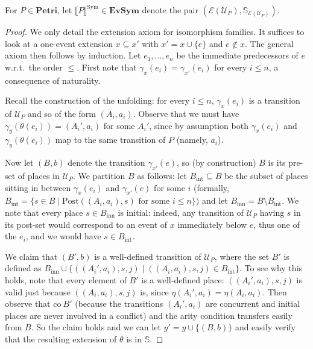 \documentclass[11pt,a4paper]{article}
\theoremstyle{plain}
\theoremstyle{definition}
\theoremstyle{remark}
\newcommand{\calE}{\mathcal{E}}
\newcommand{\calU}{\mathcal{U}}
\newcommand{\Petri}{\mathbf{Petri}}
\newcommand{\SES}{\mathbf{EvSym}}
\newcommand{\Post}{\mathrm{Post}}
\newcommand{\semSA}[1]{\llbracket #1 \rrbracket^{\mathrm{Sym}}}
\begin{document}
For $P \in \Petri$, let $\semSA{P} \in \SES$ denote the pair $(\calE(\calU_{P}), \mathbb{S}_{\calE(\calU_P)})$.



\begin{proof}
    We only detail the extension axiom for isomorphism families. It suffices to look at a one-event extension $x \subseteq x'$ with $x' = x \cup \{ e \}$ and $e \notin x$. The general axiom then follows by induction. Let $e_1, \ldots, e_n$ be the immediate predecessors of $e$ w.r.t.~the order $\leq$. First note that $\gamma_x(e_i) = \gamma_{x'}(e_i)$ for every $i \leq n$, a consequence of naturality.

		Recall the construction of the unfolding: for every $i \leq n$, $\gamma_x(e_i)$ is a transition of $\calU_P$ and so of the form $(A_i, a_i)$. Observe that we must have $\gamma_y(\theta(e_i)) = (A_i', a_i)$ for some $A_i'$, since by assumption both $\gamma_x(e_i)$ and $\gamma_y(\theta(e_i))$ map to the same transition of $P$ (namely, $a_i$). 

	Now let $(B, b)$ denote the transition $\gamma_{x'}(e)$, so (by construction) $B$ is its pre-set of places in $\calU_P$. We partition $B$ as follows: let $B_{\mathrm{int}} \subseteq B$ be the subset of places sitting in between $\gamma_x(e_i)$ and $\gamma_{x'}(e)$ for some $i$ (formally,
       $B_{\mathrm{int}} = \{ s \in B \mid \Post((A_i, a_i), s) \text{ for some } i \leq n \})$ and  
   let $B_{\mathrm{inn}} = B \setminus B_{\mathrm{int}}$. We note that every place $s \in B_{\mathrm{inn}}$ is initial: indeed, any transition of $\calU_P$ having $s$ in its post-set would correspond to an event of $x$ immediately below $e$, thus one of the $e_i$, and we would have $s \in B_{\mathrm{int}}$.
		
   We claim that $(B', b)$ is a well-defined transition of $\calU_P$, where the set $B'$ is defined as $B_{\mathrm{inn}} \cup \{   ((A_i', a_i), s, j) \mid ((A_i, a_i), s, j) \in B_{\mathrm{int}} \}$. To see why this holds, note that every element of $B'$ is a well-defined place: $((A_i', a_i), s, j)$ is valid just because $((A_i, a_i), s, j)$ is, since $\eta(A_i', a_i)= \eta(A_i, a_i)$. Then observe that $\mathrm{co}~B'$ (because the transitions $(A_i', a_i)$ are concurrent and initial places are never involved in a conflict) and the arity condition transfers easily from $B$. So the claim holds and we can let $y' = y \cup \{ (B, b)\}$ and easily verify that the resulting extension of $\theta$ is in $\mathbb S$. 
\end{proof}
	
\end{document}
